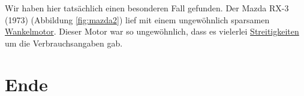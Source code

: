 \documentclass[
  ngerman,
]{book}
\begin{document}
Wir haben hier tatsächlich einen besonderen Fall gefunden. Der Mazda RX-3 (1973) (Abbildung \ref{fig:mazda2}) lief mit einem ungewöhnlich sparsamen \href{https://de.wikipedia.org/wiki/Wankelmotor}{Wankelmotor}. Dieser Motor war so ungewöhnlich, dass es vielerlei \href{https://nepis.epa.gov/Exe/ZyNET.exe/9100X47O.txt?ZyActionD=ZyDocument\&Client=EPA\&Index=Prior\%20to\%201976\&Docs=\&Query=\&Time=\&EndTime=\&SearchMethod=1\&TocRestrict=n\&Toc=\&TocEntry=\&QField=\&QFieldYear=\&QFieldMonth=\&QFieldDay=\&UseQField=\&IntQFieldOp=0\&ExtQFieldOp=0\&XmlQuery=\&File=D\%3A\%5CZYFILES\%5CINDEX\%20DATA\%5C70THRU75\%5CTXT\%5C00000016\%5C9100X47O.txt\&User=ANONYMOUS\&Password=anonymous\&SortMethod=h\%7C-\&MaximumDocuments=1\&FuzzyDegree=0\&ImageQuality=r75g8/r75g8/x150y150g16/i425\&Display=hpfr\&DefSeekPage=x\&SearchBack=ZyActionL\&Back=ZyActionS\&BackDesc=Results\%20page\&MaximumPages=1\&ZyEntry=2\#}{Streitigkeiten} um die Verbrauchsangaben gab.

\hypertarget{ende-1}{%
\section{Ende}\label{ende-1}}

  
\end{document}
